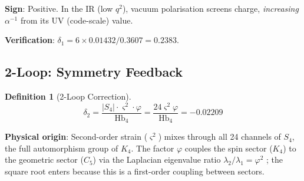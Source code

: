 \documentclass[11pt,a4paper]{article}
\theoremstyle{definition}
\newtheorem{definition}[theorem]{Definition}
\newcommand{\Hbfour}{\mathrm{Hb}_4}
\newcommand{\gs}{\varsigma}
\begin{document}
\textbf{Sign}: Positive. In the IR (low $q^2$), vacuum polarisation screens charge, \emph{increasing} $\alpha^{-1}$ from its UV (code-scale) value.

\textbf{Verification}: $\delta_1 = 6 \times 0.01432 / 0.3607 = 0.2383$.

\subsection{2-Loop: Symmetry Feedback}

\begin{definition}[2-Loop Correction]
\begin{equation}
\delta_2 = \frac{|S_4| \cdot \gs^2 \cdot \varphi}{\Hbfour} = \frac{24\gs^2\varphi}{\Hbfour} = -0.02209
\label{eq:loop2}
\end{equation}
\end{definition}

\textbf{Physical origin}: Second-order strain ($\gs^2$) mixes through all 24 channels of $S_4$, the full automorphism group of $K_4$. The factor $\varphi$ couples the spin sector ($K_4$) to the geometric sector ($C_5$) via the Laplacian eigenvalue ratio $\lambda_2/\lambda_1 = \varphi^2$ \cite{Hubka2026QSDsupp}; the square root enters because this is a first-order coupling between sectors.
\end{document}
